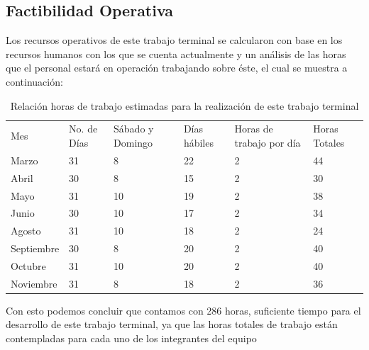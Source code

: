 \documentclass[12pt, a4paper, titlepage]{report}
\begin{document}
    	\subsection{Factibilidad Operativa}
    	Los recursos operativos de este trabajo terminal se calcularon con base en los recursos humanos con los que se cuenta actualmente y un análisis de las horas que el personal estará en operación trabajando sobre éste, el cual se muestra a continuación:
    	
    	\begin{table}[h!]
    		\begin{tabular}{|p{2cm}|p{1.4cm}|p{2.2cm}|p{1.6cm}|p{2.2cm}|p{1.6cm}|}
    			\hline    			
    			\rowcolor{guindapoli}
    			\multicolumn{6}{|c|}{\textbf{\textcolor{white}{Horas a trabajar en el desarrollo del trabajo terminal}}}\\
    			\hline
    			Mes & No. de Días & Sábado y Domingo & Días hábiles & Horas de trabajo por día & Horas Totales \\
    			\hline
    			Marzo & 31 & 8 & 22 & 2 & 44 \\ 
    			\hline
    			Abril & 30 & 8 & 15 & 2 & 30 \\ 
    			\hline
    			Mayo & 31 & 10 & 19 & 2 & 38 \\
    			\hline
    			Junio & 30 & 10 & 17 & 2 & 34 \\
    			\hline
    			Agosto & 31 & 10 & 18 & 2 & 24 \\
    			\hline
    			Septiembre & 30 & 8 & 20 & 2 & 40 \\ 
    			\hline
    			Octubre & 31 & 10 & 20 & 2 & 40 \\ 
    			\hline
    			Noviembre & 31 & 8 & 18 & 2 & 36 \\ 
    			\hline
    		\end{tabular}
    		\caption[Horas de trabajo]{Relación horas de trabajo estimadas para la realización de este trabajo terminal}
    	\end{table}
    	Con esto podemos concluir que contamos con 286 horas, suficiente tiempo para el desarrollo de este trabajo terminal, ya que las horas totales de trabajo están contempladas para cada uno de los integrantes del equipo
    	
\end{document}
